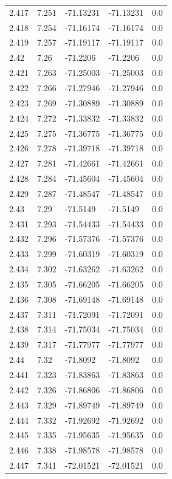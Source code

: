 \begin{tabular}{lllll}
2.417 & 7.251 & -71.13231 & -71.13231 & 0.0 \\
2.418 & 7.254 & -71.16174 & -71.16174 & 0.0 \\
2.419 & 7.257 & -71.19117 & -71.19117 & 0.0 \\
2.42 & 7.26 & -71.2206 & -71.2206 & 0.0 \\
2.421 & 7.263 & -71.25003 & -71.25003 & 0.0 \\
2.422 & 7.266 & -71.27946 & -71.27946 & 0.0 \\
2.423 & 7.269 & -71.30889 & -71.30889 & 0.0 \\
2.424 & 7.272 & -71.33832 & -71.33832 & 0.0 \\
2.425 & 7.275 & -71.36775 & -71.36775 & 0.0 \\
2.426 & 7.278 & -71.39718 & -71.39718 & 0.0 \\
2.427 & 7.281 & -71.42661 & -71.42661 & 0.0 \\
2.428 & 7.284 & -71.45604 & -71.45604 & 0.0 \\
2.429 & 7.287 & -71.48547 & -71.48547 & 0.0 \\
2.43 & 7.29 & -71.5149 & -71.5149 & 0.0 \\
2.431 & 7.293 & -71.54433 & -71.54433 & 0.0 \\
2.432 & 7.296 & -71.57376 & -71.57376 & 0.0 \\
2.433 & 7.299 & -71.60319 & -71.60319 & 0.0 \\
2.434 & 7.302 & -71.63262 & -71.63262 & 0.0 \\
2.435 & 7.305 & -71.66205 & -71.66205 & 0.0 \\
2.436 & 7.308 & -71.69148 & -71.69148 & 0.0 \\
2.437 & 7.311 & -71.72091 & -71.72091 & 0.0 \\
2.438 & 7.314 & -71.75034 & -71.75034 & 0.0 \\
2.439 & 7.317 & -71.77977 & -71.77977 & 0.0 \\
2.44 & 7.32 & -71.8092 & -71.8092 & 0.0 \\
2.441 & 7.323 & -71.83863 & -71.83863 & 0.0 \\
2.442 & 7.326 & -71.86806 & -71.86806 & 0.0 \\
2.443 & 7.329 & -71.89749 & -71.89749 & 0.0 \\
2.444 & 7.332 & -71.92692 & -71.92692 & 0.0 \\
2.445 & 7.335 & -71.95635 & -71.95635 & 0.0 \\
2.446 & 7.338 & -71.98578 & -71.98578 & 0.0 \\
2.447 & 7.341 & -72.01521 & -72.01521 & 0.0 \\

\end{tabular}
